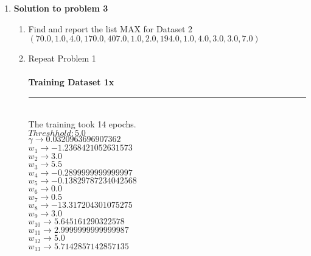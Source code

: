 
\usepackage{algorithm}
\usepackage{listings}
\usepackage{graphicx,amssymb,amsmath}
\usepackage{epstopdf}
\usepackage{color}
\sloppy


\oddsidemargin 0in
\evensidemargin 0in
\textwidth 6.5in
\topmargin -0.5in
\textheight 9.0in




\pagestyle{myheadings}  %

\begin{enumerate}

	\item{\bf Solution to problem 3}
		\begin{enumerate}
			\item{Find and report the list MAX for Dataset 2} \\
				\( (70.0, 1.0, 4.0, 170.0, 407.0, 1.0, 2.0, 194.0, 1.0, 4.0, 3.0, 3.0, 7.0) \)
			\item{Repeat Problem 1} \\ \\
				\bf{Training Dataset 1x} \\
				\noindent\rule{8cm}{0.4pt} \\
				\textnormal{The training took 14 epochs.} \\
				\(Threshhold: 5.0 \) \\
				\( \gamma \rightarrow 0.0320963696907362 \) \\
				\( w_{1} \rightarrow -1.2368421052631573 \) \\
				\( w_{2} \rightarrow 3.0 \) \\
				\( w_{3} \rightarrow 5.5 \) \\
				\( w_{4} \rightarrow -0.2899999999999997 \) \\
				\( w_{5} \rightarrow -0.13829787234042568 \) \\
				\( w_{6} \rightarrow 0.0 \) \\
				\( w_{7} \rightarrow 0.5 \) \\
				\( w_{8} \rightarrow -13.317204301075275 \) \\
				\( w_{9} \rightarrow 3.0 \) \\
				\( w_{10} \rightarrow 5.645161290322578 \) \\
				\( w_{11} \rightarrow 2.9999999999999987 \) \\
				\( w_{12} \rightarrow 5.0 \) \\
				\( w_{13} \rightarrow 5.7142857142857135 \) \\


\end{enumerate}
\end{enumerate}
